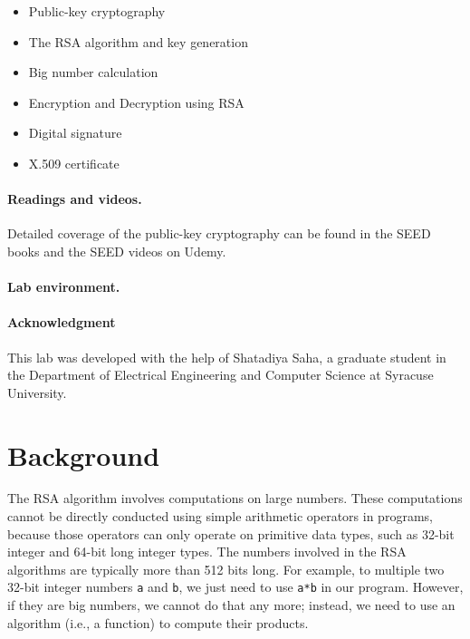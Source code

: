 \begin{itemize}[noitemsep]
\item Public-key cryptography
\item The RSA algorithm and key generation
\item Big number calculation
\item Encryption and Decryption using RSA
\item Digital signature
\item X.509 certificate
\end{itemize}


\paragraph{Readings and videos.}
Detailed coverage of the public-key cryptography can be found in 
the SEED books and the SEED videos on Udemy.

\paragraph{Lab environment.} \seedenvironmentC

\paragraph{Acknowledgment} This lab was developed with the help of
Shatadiya Saha, a graduate student in the Department of
Electrical Engineering and Computer Science at Syracuse University.




\section{Background}


The RSA algorithm involves computations on large numbers. These computations
cannot be directly conducted using simple arithmetic operators in programs, because those
operators can only operate on primitive data types, such as 32-bit integer and 64-bit long
integer types. The numbers involved in the RSA algorithms are typically more than 512 bits
long. For example, to multiple two 32-bit integer numbers \texttt{a} and \texttt{b},
we just need to use \texttt{a*b} in our program. However, if they are big numbers, we cannot
do that any more; instead, we need to use an algorithm (i.e., a function) to compute
their products.


